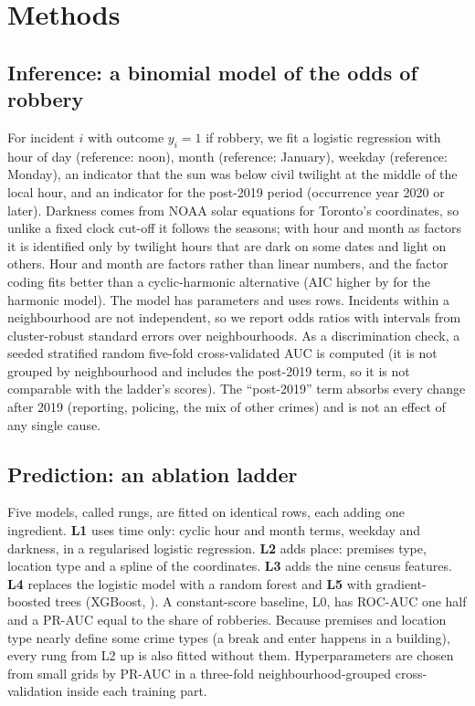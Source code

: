 \section{Methods}
\subsection{Inference: a binomial model of the odds of robbery}
For incident $i$ with outcome $y_i=1$ if robbery, we fit a logistic regression with hour of day (reference: noon), month (reference: January), weekday (reference: Monday), an indicator that the sun was below civil twilight at the middle of the local hour, and an indicator for the post-2019 period (occurrence year 2020 or later). Darkness comes from NOAA solar equations for Toronto's coordinates, so unlike a fixed clock cut-off it follows the seasons; with hour and month as factors it is identified only by twilight hours that are dark on some dates and light on others. Hour and month are factors rather than linear numbers, and the factor coding fits better than a cyclic-harmonic alternative (AIC higher by  for the harmonic model). The model has  parameters and uses  rows. Incidents within a neighbourhood are not independent, so we report odds ratios with \pct{} intervals from cluster-robust standard errors \citep{cameron2015cluster} over  neighbourhoods. As a discrimination check, a seeded stratified random five-fold cross-validated AUC is computed (it is not grouped by neighbourhood and includes the post-2019 term, so it is not comparable with the ladder's scores). The ``post-2019'' term absorbs every change after 2019 (reporting, policing, the mix of other crimes) and is not an effect of any single cause.

\subsection{Prediction: an ablation ladder}
Five models, called rungs, are fitted on identical rows, each adding one ingredient. \textbf{L1} uses time only: cyclic hour and month terms, weekday and darkness, in a regularised logistic regression. \textbf{L2} adds place: premises type, location type and a spline of the coordinates. \textbf{L3} adds the nine census features. \textbf{L4} replaces the logistic model with a random forest \citep{breiman2001rf} and \textbf{L5} with gradient-boosted trees (XGBoost, \citealt{chen2016xgboost}). A constant-score baseline, L0, has ROC-AUC one half and a PR-AUC equal to the share of robberies. Because premises and location type nearly define some crime types (a break and enter happens in a building), every rung from L2 up is also fitted without them. Hyperparameters are chosen from small grids by PR-AUC in a three-fold neighbourhood-grouped cross-validation inside each training part.


